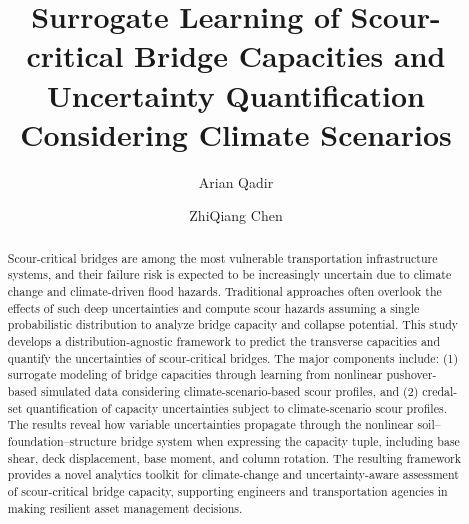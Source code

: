 \documentclass[authoryear,preprint,review,12pt]{elsarticle}
\begin{document}
\begin{frontmatter}

\title{Surrogate Learning of Scour-critical Bridge Capacities and Uncertainty Quantification Considering Climate Scenarios}


\author[a]{Arian Qadir}
\author[b]{ZhiQiang Chen}


\begin{abstract}
Scour-critical bridges are among the most vulnerable transportation infrastructure systems, and their failure risk is expected to be increasingly uncertain due to climate change and climate-driven flood hazards. Traditional approaches often overlook the effects of such deep uncertainties and compute scour hazards assuming a single probabilistic distribution to analyze bridge capacity and collapse potential. This study develops a distribution-agnostic framework to predict the transverse capacities and quantify the uncertainties of scour-critical bridges. The major components include: (1) surrogate modeling of bridge capacities through learning from nonlinear pushover-based simulated data considering climate-scenario-based scour profiles, and (2) credal-set quantification of capacity uncertainties subject to climate-scenario scour profiles. The results reveal how variable uncertainties propagate through the nonlinear soil–foundation–structure bridge system when expressing the capacity tuple, including base shear, deck displacement, base moment, and column rotation. The resulting framework provides a novel analytics toolkit for climate-change and uncertainty-aware assessment of scour-critical bridge capacity, supporting engineers and transportation agencies in making resilient asset management decisions.
\end{abstract}





\end{frontmatter}
\end{document}
